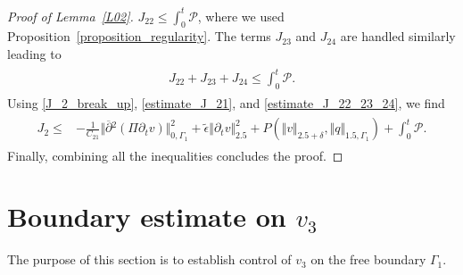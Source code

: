 \documentclass[10pt,reqno]{amsart}
\theoremstyle{plain}
\theoremstyle{definition}
\numberwithin{equation}{section}
\newcommand{\ccP}{\mathscr{P}}
\newcommand{\al}{\alpha}
\newcommand{\Ga}{\Gamma}
\newcommand{\de}{\delta}
\newcommand{\norm}[1]{\Vert#1\Vert}
\begin{document}
\begin{proof}[Proof of Lemma~\ref{L02}]
$
J_{22} 
\leq 
\int_{0}^{t}\ccP
$,
where we used Proposition~\ref{proposition_regularity}.
The terms $J_{23}$ and $J_{24}$ are handled similarly
leading to
\begin{align}
\begin{split}
J_{22} + J_{23} + J_{24} 
\leq 
\int_{0}^{t}\ccP
.
\end{split}
\label{estimate_J_22_23_24}
\end{align}
Using \eqref{J_2_break_up}, \eqref{estimate_J_21}, 
and \eqref{estimate_J_22_23_24}, we find
\begin{align}
\begin{split}
J_{2}  \leq &
- \frac{1}{C_{21}} \norm{ \overline{\partial}{}^2 (\Pi \partial_t v)}^2_{0,\Ga_1}
+
\widetilde{\epsilon}  \norm{ \partial_t v}_{2.5}^2
+ P( \norm{v}_{2.5+\de},\norm{q}_{1.5,\Ga_1})
+
\int_0^t \ccP.
\end{split}
\label{estimate_J_2}
\end{align}
Finally, combining 
all the inequalities concludes the proof.
\end{proof}

\section{Boundary estimate on $v_3$\label{section_H_2.5_estimate}}
The purpose of this section is to establish control of
$v_{3}$ on the free boundary $\Gamma_1$.
\end{document}
